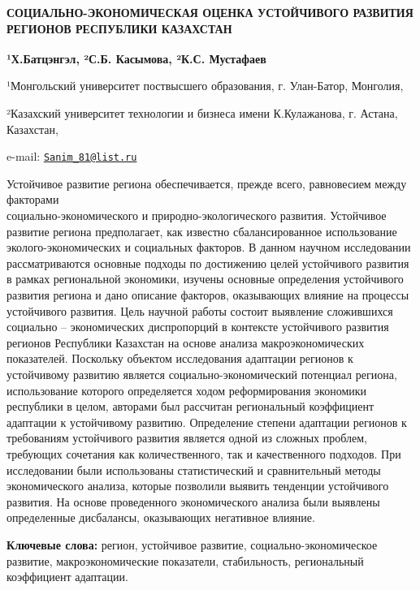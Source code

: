 \begin{articleheader}
{\bfseries СОЦИАЛЬНО-ЭКОНОМИЧЕСКАЯ ОЦЕНКА УСТОЙЧИВОГО РАЗВИТИЯ РЕГИОНОВ
РЕСПУБЛИКИ КАЗАХСТАН} 

{\bfseries ¹Х.Батцэнгэл\textsuperscript{\envelope }, ²С.Б. Касымова, ²К.С.
Мустафаев}
\end{articleheader}

\begin{affiliation}
¹Монгольский университет поствысшего образования, г. Улан-Батор,
Монголия,

²Казахский университет технологии и бизнеса имени К.Кулажанова, г.
Астана, Казахстан,

e-mail: \href{mailto:Sanim_81@list.ru}{\nolinkurl{Sanim\_81@list.ru}}
\end{affiliation}

Устойчивое развитие региона обеспечивается, прежде всего, равновесием
между факторами \\социально-экономического и природно-экологического
развития. Устойчивое развитие региона предполагает, как известно
сбалансированное использование эколого-экономических и социальных
факторов. В данном научном исследовании рассматриваются основные подходы
по достижению целей устойчивого развития в рамках региональной
экономики, изучены основные определения устойчивого развития региона и
дано описание факторов, оказывающих влияние на процессы устойчивого
развития. Цель научной работы состоит выявление сложившихся социально --
экономических диспропорций в контексте устойчивого развития регионов
Республики Казахстан на основе анализа макроэкономических показателей.
Поскольку объектом исследования адаптации регионов к устойчивому
развитию является социально-экономический потенциал региона,
использование которого определяется ходом реформирования экономики
республики в целом, авторами был рассчитан региональный коэффициент
адаптации к устойчивому развитию. Определение степени адаптации регионов
к требованиям устойчивого развития является одной из сложных проблем,
требующих сочетания как количественного, так и качественного подходов.
При исследовании были использованы статистический и сравнительный методы
экономического анализа, которые позволили выявить тенденции устойчивого
развития. На основе проведенного экономического анализа были выявлены
определенные дисбалансы, оказывающих негативное влияние.

{\bfseries Ключевые слова:} регион, устойчивое развитие,
социально-экономическое развитие, макроэкономические показатели,
стабильность, региональный коэффициент адаптации.

